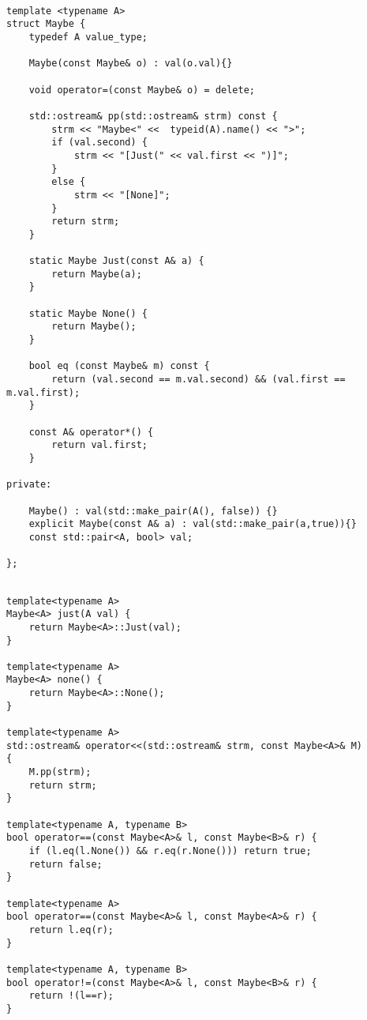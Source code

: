 \documentclass[12pt,fleqn]{article}
\begin{document}
\begin{minipage}{\linewidth}
\begin{lstlisting}[caption=Implementation of the Maybe class, label=maybe]

template <typename A>
struct Maybe {
	typedef A value_type;

	Maybe(const Maybe& o) : val(o.val){}

	void operator=(const Maybe& o) = delete;

 	std::ostream& pp(std::ostream& strm) const {
		strm << "Maybe<" <<  typeid(A).name() << ">";
		if (val.second) {
			strm << "[Just(" << val.first << ")]"; 
		}
		else {
			strm << "[None]";
		}
		return strm;
	}

	static Maybe Just(const A& a) {
		return Maybe(a);
	}

	static Maybe None() {
		return Maybe();
	}

	bool eq (const Maybe& m) const {
		return (val.second == m.val.second) && (val.first == m.val.first);
	}
	
	const A& operator*() {
		return val.first;
	}

private: 

	Maybe() : val(std::make_pair(A(), false)) {}
	explicit Maybe(const A& a) : val(std::make_pair(a,true)){}
	const std::pair<A, bool> val;

};
\end{lstlisting}
\end{minipage}

%
%
%

%
%

\begin{minipage}{\linewidth}
\begin{lstlisting}[caption=auxilliary function for the Maybe class, label=maybeaux]

template<typename A>
Maybe<A> just(A val) {
	return Maybe<A>::Just(val);
}

template<typename A>
Maybe<A> none() {
	return Maybe<A>::None();
}

template<typename A>
std::ostream& operator<<(std::ostream& strm, const Maybe<A>& M) 
{
	M.pp(strm);
	return strm;
}

template<typename A, typename B>
bool operator==(const Maybe<A>& l, const Maybe<B>& r) {
	if (l.eq(l.None()) && r.eq(r.None())) return true;
	return false;
}

template<typename A>
bool operator==(const Maybe<A>& l, const Maybe<A>& r) {
	return l.eq(r);
}

template<typename A, typename B>
bool operator!=(const Maybe<A>& l, const Maybe<B>& r) {
	return !(l==r);
}

\end{lstlisting}
\end{minipage}
\end{document}
